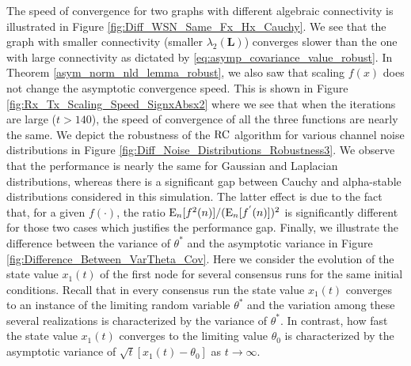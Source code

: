 \documentclass[onecolumn, draft, 12pt]{IEEEtran}
\newcommand{\E}{{\rm E}}
\newcommand{\rnld}{\rm RC}
\newcommand{\La}{\mathbf{L}}
\newcommand{\cval}{\ensuremath{\theta^{*}}}
\begin{document}
The speed of convergence for two graphs with different algebraic connectivity is illustrated in Figure \ref{fig:Diff_WSN_Same_Fx_Hx_Cauchy}. We see that the graph with smaller connectivity (smaller $\lambda_2(\La)$) converges slower than the one with large connectivity as dictated by  \eqref{eq:asymp_covariance_value_robust}. In Theorem \ref{asym_norm_nld_lemma_robust}, we also saw that scaling $f(x)$ does not change the asymptotic convergence speed. This is shown in Figure \ref{fig:Rx_Tx_Scaling_Speed_SignxAbsx2} where we see that when the iterations are large ($t > 140$), the speed of convergence of all the three functions are nearly the same. We depict the robustness of the $\rnld$ algorithm for various channel noise distributions in Figure \ref{fig:Diff_Noise_Distributions_Robustness3}. We observe that the performance is nearly the same for Gaussian and Laplacian distributions, whereas there is a significant gap between Cauchy and alpha-stable distributions considered in this simulation. The latter effect is due to the fact that, for a given $f(\cdot)$, the ratio $ \E_n [f^2(n)] / (\E_n[f^{'}(n)])^2 $ is significantly different for those two cases which justifies the performance gap. Finally, we illustrate the difference between the variance of $\cval$ and the asymptotic variance in Figure \ref{fig:Difference_Between_VarTheta_Cov}. Here we consider the evolution of the state value $x_1(t)$ of the first node for several consensus runs for the same initial conditions. Recall that in every consensus run the state value $x_1(t)$ converges to an instance of the limiting random variable $\cval$ and the variation among these several realizations is characterized by the variance of $\cval$. In contrast, how fast the state value $x_1(t)$ converges to the limiting value $\theta_{0}$ is characterized by the asymptotic variance of $\sqrt{t} [x_{1}(t) - \theta_{0}]$ as $t \rightarrow \infty$.
\end{document}
